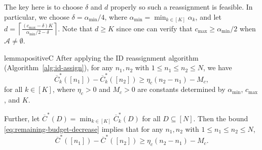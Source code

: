 \documentclass{article}
\theoremstyle{plain}
\theoremstyle{remark}
\newcommand{\rembud}{\overline{C}^*} %
\newcommand{\costIDreassign}{\delta} %
\newcommand{\gsizeIDreassign}{d} %
\newcommand{\cA}{\mathcal{A}}
\begin{document}
The key here is to choose $\costIDreassign$ and $\gsizeIDreassign$ properly so such a reassignment is feasible.
In particular, we choose $\costIDreassign=\alpha_{\min}/4$, where $\alpha_{\min}=\min_{k\in[K]}\alpha_k$, and let
$\gsizeIDreassign = \left\lceil \frac{(c_{\max}-\costIDreassign)K}{\alpha_{\min}/2-\costIDreassign}\right\rceil.$
Note that $\gsizeIDreassign\ge K$ since one can verify that $c_{\max}\ge \alpha_{\min}/2$ when $\cA\neq \emptyset$. 



\begin{restatable}{lemma}{positiveC}\label{lem:positiveC}
After applying the ID reassignment algorithm (Algorithm~\ref{alg:id-assign}), for any $n_1,n_2$ with $1\le n_1\le n_2\le N$, we have
\begin{equation}\label{eq:remaining-budget-decrease}
    \rembud_k([n_1])-\rembud_k([n_2])\ge \eta_c(n_2-n_1)-M_c,
\end{equation}
for all $k\in[K]$,
where $\eta_c>0$ and $M_c>0$ are constants determined by $\alpha_{\min}$, $c_{\max}$, and $K$.

Further, let $\rembud(D)=\min_{k\in[K]}\rembud_k(D)$ for all $D\subseteq [N]$.  Then the bound \eqref{eq:remaining-budget-decrease} implies that for any $n_1,n_2$ with $1\le n_1\le n_2\le N$,
\begin{equation}
    \rembud([n_1])-\rembud([n_2])\ge \eta_c(n_2-n_1)-M_c.
\end{equation}
\end{restatable}
\end{document}
